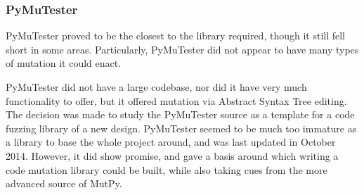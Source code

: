 \subsubsection{PyMuTester}
\label{fuzzing_pymutester}
PyMuTester\cite{GitHu12:online} proved to be the closest to the library required, though it still fell short in some areas. Particularly, PyMuTester did not appear to have many types of mutation it could enact. \par
PyMuTester did not have a large codebase\cite{GitHu12:online}, nor did it have very much functionality to offer, but it offered mutation via Abstract Syntax Tree editing. The decision was made to study the PyMuTester source as a template for a code fuzzing library of a new design. PyMuTester seemed to be much too immature as a library to base the whole project around, and was last updated in October 2014. However, it did show promise, and gave a basis around which writing a code mutation library could be built, while also taking cues from the more advanced source of MutPy\cite{khala8:online}.  \par%
